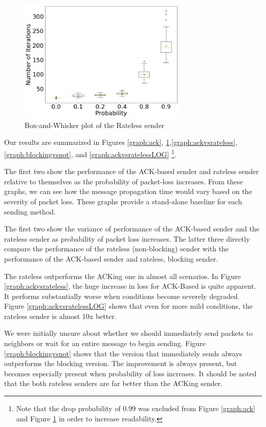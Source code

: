 \begin{figure}[tp]
\centering
\noindent
\includegraphics[width=8cm]{figures/rateless_FINAL.png}
\caption{Box-and-Whisker plot of the Rateless sender}
\label{graph:rateless}
\end{figure}


Our results are summarized in Figures \ref{graph:ack}, \ref{graph:rateless},\ref{graph:ackvsrateless}, \ref{graph:blockingvsnot}, and \ref{graph:ackvsratelessLOG} \footnote{Note that the drop probability of $0.99$ was excluded from Figure \ref{graph:ack} and Figure \ref{graph:rateless} in order to increase readability.}.

The first two show the performance of the ACK-based sender and rateless sender relative to themselves as the probability of packet-loss increases. From these graphs, we can see how the message propagation time would vary based on the severity of packet loss. These graphs provide a stand-alone baseline for each sending method.  

The first two show the variance of performance of the ACK-based sender and the rateless sender as probability of packet loss increases. The latter three directly compare the performance of the rateless (non-blocking) sender with the performance of the ACK-based sender and rateless, blocking sender. 

The rateless outperforms the ACKing one in almost all scenarios. In Figure \ref{graph:ackvsrateless}, the huge increase in loss for ACK-Based is quite apparent. It performs substantially worse when conditions become severely degraded. Figure \ref{graph:ackvsratelessLOG} shows that even for more mild conditions, the rateless sender is almost 10x better.

We were initially unsure about whether we should immediately send packets to neighbors or wait for an entire message to begin sending. Figure \ref{graph:blockingvsnot} shows that the version that immediately sends always outperforms the blocking version. The improvement is always present, but becomes especially present when probability of loss increases. It should be noted that the both rateless senders are far better than the ACKing sender.

